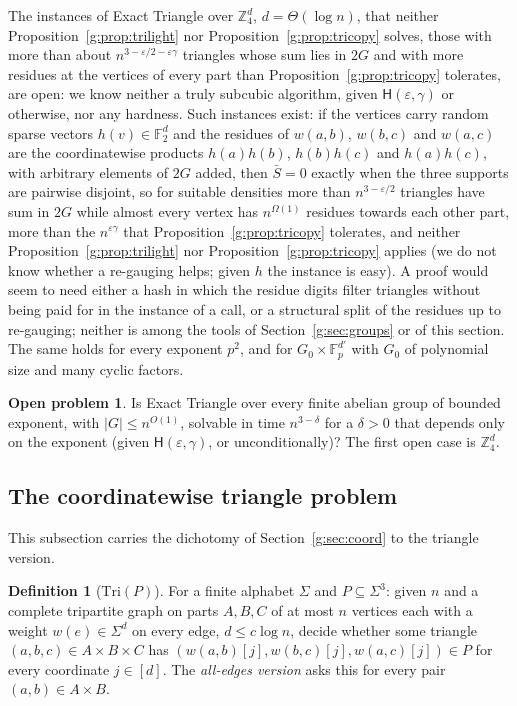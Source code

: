 \documentclass[11pt]{article}
\theoremstyle{definition}
\newtheorem{definition}[theorem]{Definition}
\newtheorem{problem}[theorem]{Open problem}
\theoremstyle{remark}
\newcommand{\Z}{\mathbb{Z}}
\newcommand{\F}{\mathbb{F}_2}
\newcommand{\Fp}{\mathbb{F}_p}
\newcommand{\eps}{\varepsilon}
\newcommand{\Hyp}{\mathsf{H}}
\begin{document}
The instances of Exact Triangle over $\Z_4^d$, $d=\Theta(\log n)$, that neither Proposition~\ref{g:prop:trilight} nor Proposition~\ref{g:prop:tricopy} solves, those with more than about $n^{3-\eps/2-\eps\gamma}$ triangles whose sum lies in $2G$ and with more residues at the vertices of every part than Proposition~\ref{g:prop:tricopy} tolerates, are open: we know neither a truly subcubic algorithm, given $\Hyp(\eps,\gamma)$ or otherwise, nor any hardness. Such instances exist: if the vertices carry random sparse vectors $h(v)\in\F^d$ and the residues of $w(a,b)$, $w(b,c)$ and $w(a,c)$ are the coordinatewise products $h(a)h(b)$, $h(b)h(c)$ and $h(a)h(c)$, with arbitrary elements of $2G$ added, then $\bar S=0$ exactly when the three supports are pairwise disjoint, so for suitable densities more than $n^{3-\eps/2}$ triangles have sum in $2G$ while almost every vertex has $n^{\Omega(1)}$ residues towards each other part, more than the $n^{\eps\gamma}$ that Proposition~\ref{g:prop:tricopy} tolerates, and neither Proposition~\ref{g:prop:trilight} nor Proposition~\ref{g:prop:tricopy} applies (we do not know whether a re-gauging helps; given $h$ the instance is easy). A proof would seem to need either a hash in which the residue digits filter triangles without being paid for in the instance of a call, or a structural split of the residues up to re-gauging; neither is among the tools of Section~\ref{g:sec:groups} or of this section. The same holds for every exponent $p^2$, and for $G_0\times\Fp^{d'}$ with $G_0$ of polynomial size and many cyclic factors.

\begin{problem}\label{g:prob:triexp}
Is Exact Triangle over every finite abelian group of bounded exponent, with $|G|\le n^{O(1)}$, solvable in time $n^{3-\delta}$ for a $\delta>0$ that depends only on the exponent (given $\Hyp(\eps,\gamma)$, or unconditionally)? The first open case is $\Z_4^d$.
\end{problem}

\subsection{The coordinatewise triangle problem}\label{g:sec:tri}

This subsection carries the dichotomy of Section~\ref{g:sec:coord} to the triangle version.

\begin{definition}[$\mathrm{Tri}(P)$]\label{g:def:tri}
For a finite alphabet $\Sigma$ and $P\subseteq\Sigma^3$: given $n$ and a complete tripartite graph on parts $A,B,C$ of at most $n$ vertices each with a weight $w(e)\in\Sigma^d$ on every edge, $d\le c\log n$, decide whether some triangle $(a,b,c)\in A\times B\times C$ has $(w(a,b)[j],w(b,c)[j],w(a,c)[j])\in P$ for every coordinate $j\in[d]$. The \emph{all-edges version} asks this for every pair $(a,b)\in A\times B$.
\end{definition}
\end{document}
